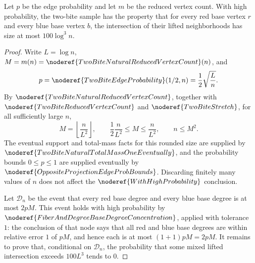 \begin{helper}[FiberAndDegreeMixedLiftedIntersectionConcentration]
\label{helper:FiberAndDegreeMixedLiftedIntersectionConcentration}
Let $p$ be the edge probability and let $m$ be the reduced vertex count.
With high probability, the two-bite sample has the property that for every red base vertex $r$ and every blue base vertex $b$, the intersection of their lifted neighborhoods has size at most $100 \log^3 n$.
\end{helper}

\begin{proof}
Write \(L=\log n\), \(M=m(n)=\noderef{TwoBiteNaturalReducedVertexCount}(n)\), and
\[
p=\noderef{TwoBiteEdgeProbability}(1/2,n)=\frac12\sqrt{\frac Ln}.
\]
By \(\noderef{TwoBiteNaturalReducedVertexCount}\), together with
\(\noderef{TwoBiteReducedVertexCount}\) and \(\noderef{TwoBiteStretch}\), for
all sufficiently large \(n\),
\[
M=\left\lfloor\frac n{L^2}\right\rfloor,\qquad
\frac12\frac n{L^2}\le M\le\frac n{L^2},\qquad n\le M^2.
\tag{1}
\]
The eventual support and total-mass facts for this rounded size are supplied
by \(\noderef{TwoBiteNaturalTotalMassOneEventually}\), and the probability
bounds \(0\le p\le1\) are supplied eventually by
\(\noderef{OppositeProjectionEdgeProbBounds}\).  Discarding finitely many
values of \(n\) does not affect the \(\noderef{WithHighProbability}\)
conclusion.

Let \(\mathcal D_n\) be the event that every red base degree and every blue
base degree is at most \(2pM\).  This event holds with high probability by
\(\noderef{FiberAndDegreeBaseDegreeConcentration}\), applied with tolerance
\(1\): the conclusion of that node says that all red and blue base degrees
are within relative error \(1\) of \(pM\), and hence each is at most
\((1+1)pM=2pM\).  It remains to prove that, conditional on
\(\mathcal D_n\), the probability that some mixed lifted intersection
exceeds \(100L^3\) tends to \(0\).


\end{proof}

